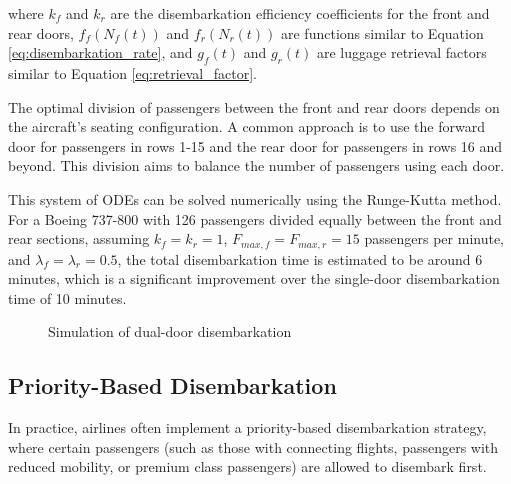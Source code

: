 \documentclass[12pt,a4paper]{article}
\begin{document}
where $k_f$ and $k_r$ are the disembarkation efficiency coefficients for the front and rear doors, $f_f(N_f(t))$ and $f_r(N_r(t))$ are functions similar to Equation \ref{eq:disembarkation_rate}, and $g_f(t)$ and $g_r(t)$ are luggage retrieval factors similar to Equation \ref{eq:retrieval_factor}.

The optimal division of passengers between the front and rear doors depends on the aircraft's seating configuration. A common approach is to use the forward door for passengers in rows 1-15 and the rear door for passengers in rows 16 and beyond. This division aims to balance the number of passengers using each door.

This system of ODEs can be solved numerically using the Runge-Kutta method. For a Boeing 737-800 with 126 passengers divided equally between the front and rear sections, assuming $k_f = k_r = 1$, $F_{max,f} = F_{max,r} = 15$ passengers per minute, and $\lambda_f = \lambda_r = 0.5$, the total disembarkation time is estimated to be around 6 minutes, which is a significant improvement over the single-door disembarkation time of 10 minutes.

\begin{figure}[H]
\centering
{}
\caption{Simulation of dual-door disembarkation}
\label{fig:dual_door}
\end{figure}

\subsection{Priority-Based Disembarkation}

In practice, airlines often implement a priority-based disembarkation strategy, where certain passengers (such as those with connecting flights, passengers with reduced mobility, or premium class passengers) are allowed to disembark first.
\end{document}
